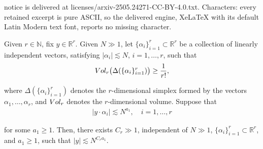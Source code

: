 \documentclass[10pt,a4paper]{amsart}
\newcommand{\Dl}{\Delta}
\newcommand{\N}{\mathbb{N}}
\newcommand{\R}{\mathbb{R}}
\newcommand{\al}{\alpha}
\newcommand{\les}{\lesssim}
\newcommand{\noi}{\noindent}
\begin{document}
notice is delivered at licenses/arxiv-2505.24271-CC-BY-4.0.txt. Characters: every retained excerpt is pure ASCII, so the delivered engine, XeLaTeX with its default Latin Modern text font, reports no missing character.
\begin{lemma}\label{LEM:Y1}

Given $r \in \N$, fix
 $y \in \R^r$.
Given $N \gg1$, let $\{\al_i \}_{i=1}^r \subset \R^r$ be a collection of linearly independent  vectors,
 satisfying 
$ |\al_i| \les  N$, $i = 1, \dots, r$, 
such that 
\begin{align}
\textup{Vol}_r
\big(\Dl(\{\al_i\}_{i = 1}^r)\big) \ge \frac1{r!}, 
\label{aux0}
\end{align}

\noi
where $\Dl(\{\al_i\}_{i = 1}^r)$ denotes the 
$r$-dimensional simplex formed by 
the vectors $\al_1, \dots, \al_r$, 
and $\textup{Vol}_r$ denotes the $r$-dimensional volume.
Suppose that
\begin{align}
|y \cdot \al_i| \les N^{a_1}, \quad i = 1, \dots, r
\label{aux1}
\end{align}

\noi
for some $a_1 \ge 1$.
Then, there exists $C_r \gg 1$, independent of $N\gg1 $,
$\{\al_i \}_{i=1}^r \subset \R^r$,  and $a_1\ge 1$,  such that $|y| \les N^{C_r a_1}$.
\end{lemma}
\end{document}

